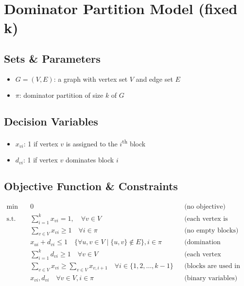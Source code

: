 \section{Dominator Partition Model (fixed k)}
\label{sec:dominator_partition_fixed_k}


\subsection*{Sets \& Parameters}
\begin{itemize}[label=, noitemsep]
    \item $G=(V,E)$: a graph with vertex set $V$ and edge set $E$
    \item $\pi$: dominator partition of size $k$ of $G$
\end{itemize}

\subsection*{Decision Variables}
\begin{itemize}[label=, noitemsep]
    \item $x_{vi}$: 1 if vertex $v$ is assigned to the $i$\textsuperscript{th} block
    \item $d_{vi}$: 1 if vertex $v$ dominates block $i$
\end{itemize}

\subsection*{Objective Function \& Constraints}
\begin{align*}
    \min \quad &0 &&\text{(no objective)}\\
    \text{s.t.} \quad
    &\sum_{i=1}^{k} x_{vi} = 1, \quad \forall v \in V &&\text{(each vertex is assigned to one block)}\\
    &\sum_{v \in V} x_{vi} \geq 1 \quad \forall i \in \pi &&\text{(no empty blocks)}\\
    &x_{ui} + d_{vi} \leq 1 \quad \{\forall u, v \in V \mid \{u,v\} \notin E\}, i \in \pi &&\text{(domination condition)}\\
    &\sum_{i=1}^{k} d_{vi} \geq 1 \quad \forall v \in V &&\text{(each vertex dominates at least one block)}\\
    & \sum_{v \in V} x_{vi} \geq \sum_{v \in V} x_{v,i+1} \quad \forall i \in \{1, 2, \dots, k-1\} &&\text{(blocks are used in order)}\\
    &x_{vi}, d_{vi} \quad \forall v \in V, i \in \pi &&\text{(binary variables)}\\
\end{align*}
